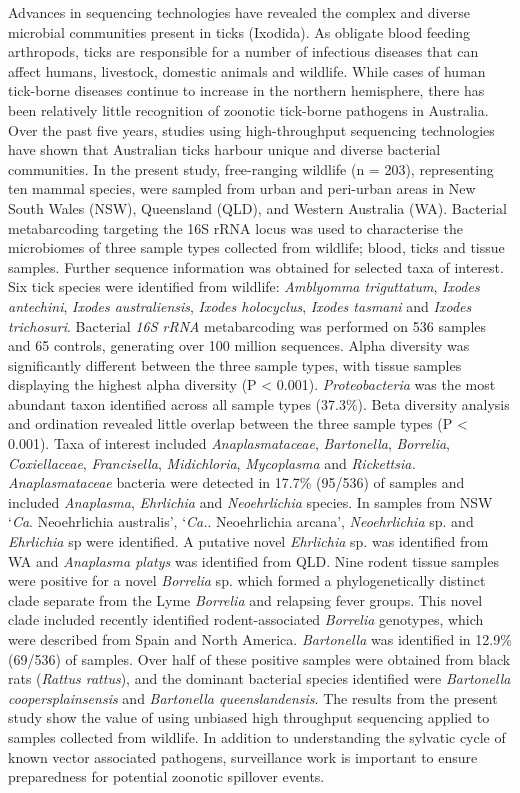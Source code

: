 \documentclass[a4paper, nobind]{templates/ociamthesis}
\begin{document}
Advances in sequencing technologies have revealed the complex and diverse microbial communities present in ticks (Ixodida).
As obligate blood feeding arthropods, ticks are responsible for a number of infectious diseases that can affect humans, livestock, domestic animals and wildlife.
While cases of human tick-borne diseases continue to increase in the northern hemisphere, there has been relatively little recognition of zoonotic tick-borne pathogens in Australia.
Over the past five years, studies using high-throughput sequencing technologies have shown that Australian ticks harbour unique and diverse bacterial communities.
In the present study, free-ranging wildlife (n = 203), representing ten mammal species, were sampled from urban and peri-urban areas in New South Wales (NSW), Queensland (QLD), and Western Australia (WA).
Bacterial metabarcoding targeting the 16S rRNA locus was used to characterise the microbiomes of three sample types collected from wildlife; blood, ticks and tissue samples.
Further sequence information was obtained for selected taxa of interest. Six tick species were identified from wildlife: \emph{Amblyomma triguttatum}, \emph{Ixodes antechini}, \emph{Ixodes australiensis}, \emph{Ixodes holocyclus}, \emph{Ixodes tasmani} and \emph{Ixodes trichosuri}.
Bacterial \emph{16S rRNA} metabarcoding was performed on 536 samples and 65 controls, generating over 100 million sequences.
Alpha diversity was significantly different between the three sample types, with tissue samples displaying the highest alpha diversity (P \textless{} 0.001).
\emph{Proteobacteria} was the most abundant taxon identified across all sample types (37.3\%).
Beta diversity analysis and ordination revealed little overlap between the three sample types (P \textless{} 0.001).
Taxa of interest included \emph{Anaplasmataceae}, \emph{Bartonella}, \emph{Borrelia}, \emph{Coxiellaceae}, \emph{Francisella}, \emph{Midichloria}, \emph{Mycoplasma} and \emph{Rickettsia.} \emph{Anaplasmataceae} bacteria were detected in 17.7\% (95/536) of samples and included \emph{Anaplasma}, \emph{Ehrlichia} and \emph{Neoehrlichia} species.
In samples from NSW `\emph{Ca}. Neoehrlichia australis', `\emph{Ca.}. Neoehrlichia arcana', \emph{Neoehrlichia} sp. and \emph{Ehrlichia} sp were identified.
A putative novel \emph{Ehrlichia} sp. was identified from WA and \emph{Anaplasma platys} was identified from QLD.
Nine rodent tissue samples were positive for a novel \emph{Borrelia} sp. which formed a phylogenetically distinct clade separate from the Lyme \emph{Borrelia} and relapsing fever groups.
This novel clade included recently identified rodent-associated \emph{Borrelia} genotypes, which were described from Spain and North America.
\emph{Bartonella} was identified in 12.9\% (69/536) of samples.
Over half of these positive samples were obtained from black rats (\emph{Rattus rattus}), and the dominant bacterial species identified were \emph{Bartonella coopersplainsensis} and \emph{Bartonella queenslandensis}.
The results from the present study show the value of using unbiased high throughput sequencing applied to samples collected from wildlife.
In addition to understanding the sylvatic cycle of known vector associated pathogens, surveillance work is important to ensure preparedness for potential zoonotic spillover events.
\end{document}
